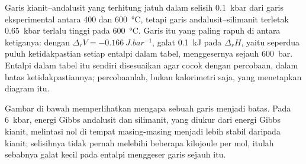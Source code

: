 Garis kianit--andalusit yang terhitung jatuh dalam selisih \qty{0.1}{kbar} dari garis eksperimental
antara 400 dan \qty{600}{\celsius}, tetapi garis andalusit--silimanit terletak
\qty{0.65}{kbar} terlalu tinggi pada \qty{600}{\celsius}. Garis itu yang paling rapuh di antara
ketiganya: dengan $\Delta_r V = \qty{-0.166}{J.bar^{-1}}$, galat \qty{0.1}{kJ} pada
$\Delta_r H$, yaitu seperdua puluh ketidakpastian setiap entalpi dalam tabel, menggesernya sejauh
\qty{600}{bar}. Entalpi dalam tabel itu sendiri disesuaikan agar cocok dengan
percobaan, dalam batas ketidakpastiannya; percobaanlah, bukan kalorimetri saja, yang menetapkan
diagram itu.

Gambar di bawah memperlihatkan mengapa sebuah garis menjadi batas. Pada \qty{6}{kbar}, energi Gibbs
andalusit dan silimanit, yang diukur dari energi Gibbs kianit, melintasi nol di tempat masing-masing
menjadi lebih stabil daripada kianit; selisihnya tidak pernah melebihi beberapa kilojoule per mol,
itulah sebabnya galat kecil pada entalpi menggeser garis sejauh itu.

\begin{omfigure}
\centering
{}
\par{}
\end{omfigure}

